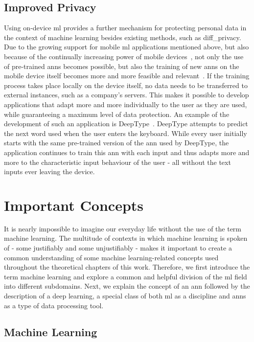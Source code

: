 \documentclass[
			   fontsize=11pt,
               paper=a4,
               bibliography=totoc,
               idxtotoc,
               headsepline,
               footsepline,
               footinclude=false,
               BCOR=12mm,
               DIV=13,
               openany,   %
               oneside    %
               ]
               {scrbook}
\begin{document}
\section{Improved Privacy} \label{sec:privacy}

Using on-device \gls{ml} provides a further mechanism for protecting personal data in the context of machine learning besides existing methods, such as \gls{diff_privacy}. Due to the growing support for mobile \gls{ml} applications mentioned above, but also because of the continually increasing power of mobile devices~\cite{mobile_cpu_power}, not only the use of pre-trained \glspl{ann} becomes possible, but also the training of new \glspl{ann} on the mobile device itself becomes more and more feasible and relevant~\cite{liu19}. If the training process takes place locally on the device itself, no data needs to be transferred to external instances, such as a company's servers. This makes it possible to develop applications that adapt more and more individually to the user as they are used, while guaranteeing a maximum level of data protection. An example of the development of such an application is DeepType~\cite{deepType}. DeepType attempts to predict the next word used when the user enters the keyboard. While every user initially starts with the same pre-trained version of the \gls{ann} used by DeepType, the application continues to train this \gls{ann} with each input and thus adapts more and more to the characteristic input behaviour of the user - all without the text inputs ever leaving the device.


\chapter{Important Concepts}

It is nearly impossible to imagine our everyday life without the use of the term machine learning. The multitude of contexts in which machine learning is spoken of - some justifiably and some unjustifiably - makes it important to create a common understanding of some machine learning-related concepts used throughout the theoretical chapters of this work. Therefore, we first introduce the term machine learning and explore a common and helpful division of the \acrlong{ml} field into different subdomains. Next, we explain the concept of an \acrlong{ann} followed by the description of a deep learning, a special class of both \acrfull{ml} as a discipline and \glspl{ann} as a type of data processing tool.

\section{Machine Learning}
\end{document}
